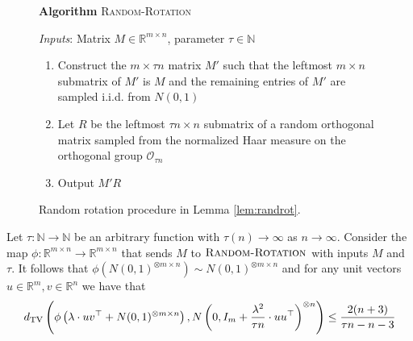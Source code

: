 \begin{figure}[t!]
\begin{algbox}
\textbf{Algorithm} \textsc{Random-Rotation}

\vspace{2mm}

\textit{Inputs}: Matrix $M \in \mathbb{R}^{m \times n}$, parameter $\tau \in \mathbb{N}$
\begin{enumerate}
\item Construct the $m \times \tau n$ matrix $M'$ such that the leftmost $m \times n$ submatrix of $M'$ is $M$ and the remaining entries of $M'$ are sampled i.i.d. from $N(0, 1)$
\item Let $R$ be the leftmost $\tau n \times n$ submatrix of a random orthogonal matrix sampled from the normalized Haar measure on the orthogonal group $\mathcal{O}_{\tau n}$
\item Output $M'R$
\end{enumerate}
\vspace{1mm}
\end{algbox}
\caption{Random rotation procedure in Lemma \ref{lem:randrot}.}
\label{fig:randrot}
\end{figure}

\begin{lemma} \label{lem:randrot}
Let $\tau : \mathbb{N} \to \mathbb{N}$ be an arbitrary function with $\tau(n) \to \infty$ as $n \to \infty$. Consider the map $\phi : \mathbb{R}^{m \times n} \to \mathbb{R}^{m \times n}$ that sends $M$ to $\textsc{Random-Rotation}$ with inputs $M$ and $\tau$. It follows that $\phi(N(0, 1)^{\otimes m \times n}) \sim N(0, 1)^{\otimes m \times n}$ and for any unit vectors $u \in \mathbb{R}^m, v \in \mathbb{R}^n$ we have that
$$d_{\text{TV}}\left( \phi\left( \lambda \cdot uv^\top + N(0, 1)^{\otimes m \times n} \right), N\left(0, I_m + \frac{\lambda^2}{\tau n} \cdot uu^\top\right)^{\otimes n} \right) \le \frac{2(n + 3)}{\tau n - n - 3}$$
\end{lemma}

